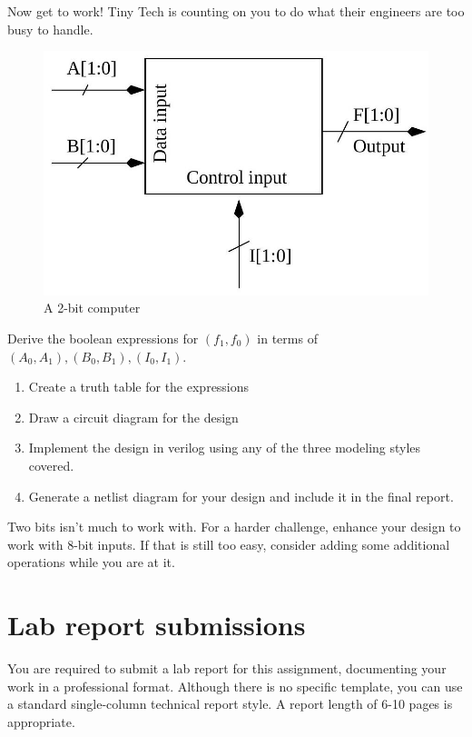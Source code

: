 \documentclass[12pt]{journal}
\begin{document}
Now get to work! Tiny Tech is counting on you to do what their engineers are too busy to handle.

\begin{figure}
    \centering
    \includegraphics[width=0.5\linewidth]{2024_09_05_b54c49500848b4490d27g-2.jpg}
    \caption{A 2-bit computer}
    \label{fig:2bitblock}
\end{figure}

\begin{question}
    Derive the boolean expressions for $(f_1, f_0)$ in terms of $(A_0, A_1), (B_0, B_1), (I_0, I_1)$.
    \begin{enumerate}
        \item Create a truth table for the expressions
        \item Draw a circuit diagram for the design
        \item Implement the design in verilog using any of the three modeling styles covered.
        \item Generate a netlist diagram for your design and include it in the final report.
    \end{enumerate}
\end{question}

\begin{bonusquestion}
    Two bits isn't much to work with. For a harder challenge, enhance your design to work with 8-bit inputs. If that is still too easy, consider adding some additional operations while you are at it.
\end{bonusquestion}

\section{Lab report submissions}

You are required to submit a lab report for this assignment, documenting your work in a professional format. Although there is no specific template, you can use a standard single-column technical report style. A report length of 6-10 pages is appropriate.
\end{document}
